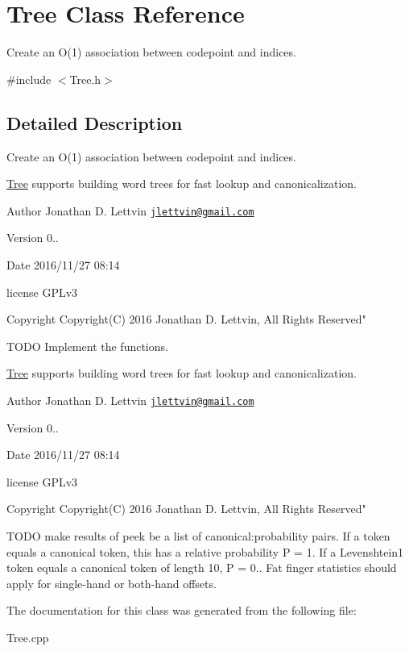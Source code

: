 \hypertarget{class_tree}{}\section{Tree Class Reference}
\label{class_tree}


Create an O(1) association between codepoint and indices.  




{\ttfamily \#include $<$Tree.\+h$>$}



\subsection{Detailed Description}
Create an O(1) association between codepoint and indices. 

\hyperlink{class_tree}{Tree} supports building word trees for fast lookup and canonicalization.

\begin{DoxyAuthor}{Author}
Jonathan D. Lettvin \href{mailto:jlettvin@gmail.com}{\tt jlettvin@gmail.\+com}
\end{DoxyAuthor}
\begin{DoxyVersion}{Version}
0..
\end{DoxyVersion}
\begin{DoxyDate}{Date}
2016/11/27 08\+:14
\end{DoxyDate}
license G\+P\+Lv3

\begin{DoxyCopyright}{Copyright}
Copyright(\+C) 2016 Jonathan D. Lettvin, All Rights Reserved"
\end{DoxyCopyright}
T\+O\+D\+O Implement the functions.

\hyperlink{class_tree}{Tree} supports building word trees for fast lookup and canonicalization.

\begin{DoxyAuthor}{Author}
Jonathan D. Lettvin \href{mailto:jlettvin@gmail.com}{\tt jlettvin@gmail.\+com}
\end{DoxyAuthor}
\begin{DoxyVersion}{Version}
0..
\end{DoxyVersion}
\begin{DoxyDate}{Date}
2016/11/27 08\+:14
\end{DoxyDate}
license G\+P\+Lv3

\begin{DoxyCopyright}{Copyright}
Copyright(\+C) 2016 Jonathan D. Lettvin, All Rights Reserved"
\end{DoxyCopyright}
T\+O\+D\+O make results of peek be a list of canonical\+:probability pairs. If a token equals a canonical token, this has a relative probability P = 1. If a Levenshtein1 token equals a canonical token of length 10, P = 0.. Fat finger statistics should apply for single-\/hand or both-\/hand offsets. 

The documentation for this class was generated from the following file\+:\begin{DoxyCompactItemize}
\item 
Tree.\+cpp\end{DoxyCompactItemize}
